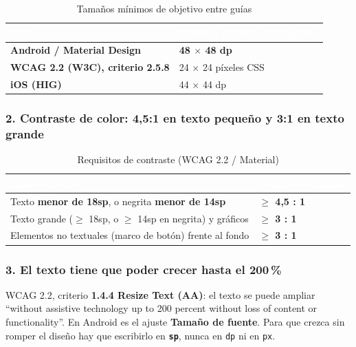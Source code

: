\documentclass[11pt,a4paper]{article}
\newcommand{\code}[1]{\texttt{\color{primary}#1}}
\begin{document}
	\begin{table}[htbp]
		\centering
		\small
		\begin{tabular}{@{}l l@{}}
			\toprule
			\rowcolor{primary}
			\textcolor{white}{\sffamily\bfseries Guía} & \textcolor{white}{\sffamily\bfseries Tamaño mínimo del objetivo} \\
			\midrule
			\textbf{Android / Material Design} & \textbf{48 $\times$ 48 dp} \\
			\rowcolor{soft}
			\textbf{WCAG 2.2 (W3C), criterio 2.5.8} & 24 $\times$ 24 píxeles CSS \\
			\textbf{iOS (HIG)} & 44 $\times$ 44 dp \\
			\bottomrule
		\end{tabular}
		\caption{Tamaños mínimos de objetivo entre guías}
	\end{table}
	
	\subsubsection*{2. Contraste de color: 4,5:1 en texto pequeño y 3:1 en texto grande}
	
	\begin{table}[htbp]
		\centering
		\small
		\begin{tabularx}{\textwidth}{@{}>{\RaggedRight\arraybackslash}p{6cm} >{\RaggedRight\arraybackslash}X@{}}
			\toprule
			\rowcolor{primary}
			\textcolor{white}{\sffamily\bfseries Tipo de texto} & \textcolor{white}{\sffamily\bfseries Contraste mínimo} \\
			\midrule
			Texto \textbf{menor de 18sp}, o negrita \textbf{menor de 14sp} & \textbf{$\geq$ 4,5 : 1} \\
			\rowcolor{soft}
			Texto grande ($\geq$ 18sp, o $\geq$ 14sp en negrita) y gráficos & \textbf{$\geq$ 3 : 1} \\
			Elementos no textuales (marco de botón) frente al fondo & \textbf{$\geq$ 3 : 1} \\
			\bottomrule
		\end{tabularx}
		\caption{Requisitos de contraste (WCAG 2.2 / Material)}
	\end{table}
	
	\subsubsection*{3. El texto tiene que poder crecer hasta el 200\,\%}
	
	WCAG 2.2, criterio \textbf{1.4.4 Resize Text (AA)}: el texto se puede ampliar \enquote{without assistive technology up to 200 percent without loss of content or functionality}. En Android es el ajuste \textbf{Tamaño de fuente}. Para que crezca sin romper el diseño hay que escribirlo en \textbf{\code{sp}}, nunca en \code{dp} ni en \code{px}.
	
\end{document}

